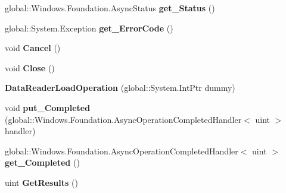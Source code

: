 \begin{DoxyCompactItemize}
global\+::\+Windows.\+Foundation.\+Async\+Status {\bfseries get\+\_\+\+Status} ()
\item 
\mbox{\label{class_windows_1_1_storage_1_1_streams_1_1_data_reader_load_operation_a2c6181e3b5357ed9b288bdf9ac27171d}} 
global\+::\+System.\+Exception {\bfseries get\+\_\+\+Error\+Code} ()
\item 
\mbox{\label{class_windows_1_1_storage_1_1_streams_1_1_data_reader_load_operation_afc9128d61314f4f914e6ced27b10551a}} 
void {\bfseries Cancel} ()
\item 
\mbox{\label{class_windows_1_1_storage_1_1_streams_1_1_data_reader_load_operation_a4b0027a73595ac1ed2b96b4c17c64541}} 
void {\bfseries Close} ()
\item 
\mbox{\label{class_windows_1_1_storage_1_1_streams_1_1_data_reader_load_operation_a1bc1b17adae2e272b26f6a612e36b5a9}} 
{\bfseries Data\+Reader\+Load\+Operation} (global\+::\+System.\+Int\+Ptr dummy)
\item 
\mbox{\label{class_windows_1_1_storage_1_1_streams_1_1_data_reader_load_operation_a825056cde4984124d6ba72b348a21927}} 
void {\bfseries put\+\_\+\+Completed} (global\+::\+Windows.\+Foundation.\+Async\+Operation\+Completed\+Handler$<$ uint $>$ handler)
\item 
\mbox{\label{class_windows_1_1_storage_1_1_streams_1_1_data_reader_load_operation_ac568f7677660d25791d132dadf2fa2b8}} 
global\+::\+Windows.\+Foundation.\+Async\+Operation\+Completed\+Handler$<$ uint $>$ {\bfseries get\+\_\+\+Completed} ()
\item 
\mbox{\label{class_windows_1_1_storage_1_1_streams_1_1_data_reader_load_operation_a71f1295140022865ce49695a3490008d}} 
uint {\bfseries Get\+Results} ()
\item 
\mbox{\label{class_windows_1_1_storage_1_1_streams_1_1_data_reader_load_operation_a6ef99092e68b2e93880c4edcaf0fd191}} 

\end{DoxyCompactItemize}
